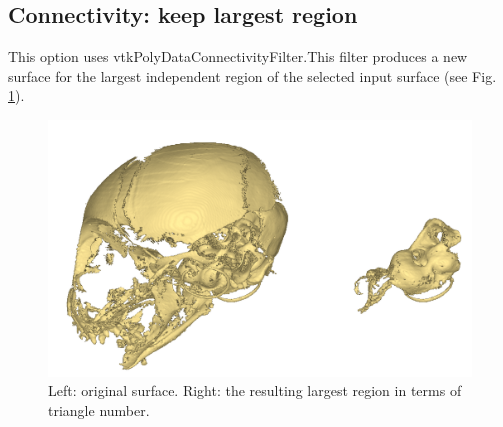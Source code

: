 \subsection{Connectivity: keep largest region}
This option uses vtkPolyDataConnectivityFilter.This filter produces a new surface for the largest independent region of the selected input surface (see Fig. \ref{largest_region}).

\begin{figure}
  \centering
  \includegraphics[scale=0.4]{images/Edit_selected_objects/03_Decompose6.png} 
	\caption{Left: original surface. Right: the resulting largest region in terms of triangle number.}
\label{largest_region}
 
\end{figure}









